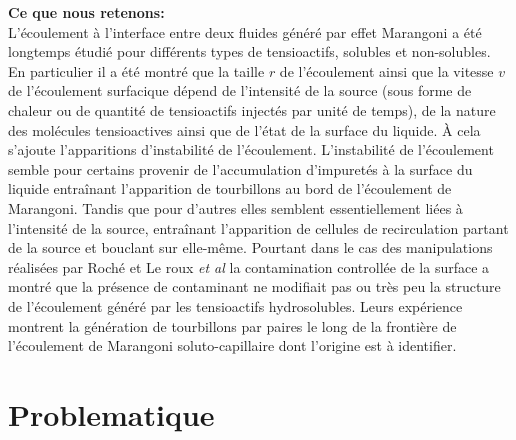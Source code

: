 \begin{ombreremarque}
  \begin{remarque}
    \noindent\textbf{Ce que nous retenons:}\\
    L'écoulement à l'interface entre deux fluides généré par effet Marangoni a été longtemps étudié pour différents types de tensioactifs, solubles et non-solubles. En particulier il a été montré que la taille $r$ de l'écoulement ainsi que la vitesse $v$ de l'écoulement surfacique dépend de l'intensité de la source (sous forme de chaleur ou de quantité de tensioactifs injectés par unité de temps), de la nature des molécules tensioactives ainsi que de l'état de la surface du liquide. À cela s'ajoute l'apparitions d'instabilité de l'écoulement. L'instabilité de l'écoulement semble pour certains provenir de l'accumulation d'impuretés à la surface du liquide entraînant l'apparition de tourbillons au bord de l'écoulement de Marangoni.  Tandis que pour d'autres elles semblent essentiellement liées à l'intensité de la source, entraînant l'apparition de cellules de recirculation partant de la source et bouclant sur elle-même. Pourtant dans le cas des manipulations réalisées par Roché et Le roux \textit{et al} la contamination controllée de la surface a montré que la présence de contaminant ne modifiait pas ou très peu la structure de l'écoulement généré par les tensioactifs hydrosolubles. Leurs expérience montrent la génération de tourbillons par paires le long de la frontière de l'écoulement de Marangoni soluto-capillaire dont l'origine est à identifier.
  \end{remarque}
\end{ombreremarque}

\section{Problematique}

